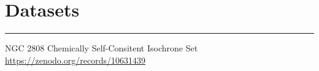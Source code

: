 \section{Datasets}
\noindent\rule{4cm}{0.4pt}
\begin{dataproductlist}
    \item[NGC 2808 Chemically Self-Consitent Isochrone Set] \url{https://zenodo.org/records/10631439}
\end{dataproductlist}
